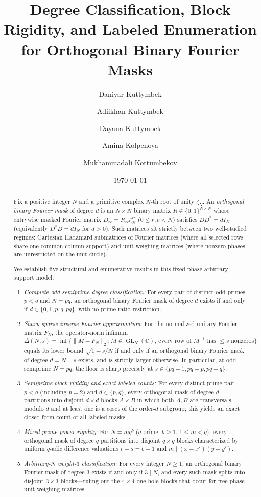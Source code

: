 \documentclass[11pt,reqno]{amsart}
\title[Orthogonal Binary Fourier Masks]{Degree Classification, Block Rigidity, and Labeled Enumeration\\for Orthogonal Binary Fourier Masks}
\author[D. Kuttymbek]{Daniyar Kuttymbek}
\author[A. Kuttymbek]{Adilkhan Kuttymbek}
\author[D. Kuttymbek]{Dayana Kuttymbek}
\author[A. Kolpenova]{Amina Kolpenova}
\author[M. Kottumbekov]{Mukhammadali Kottumbekov}
\date{\today}
\numberwithin{equation}{section}
\theoremstyle{definition}
\theoremstyle{remark}
\newcommand{\C}{\mathbb{C}}
\newcommand{\GL}{\operatorname{GL}}
\begin{document}
\begin{abstract}
Fix a positive integer $N$ and a primitive complex $N$-th root of unity $\zeta_N$. An \emph{orthogonal binary Fourier mask} of degree $d$ is an $N\times N$ binary matrix $R\in\{0,1\}^{N\times N}$ whose entrywise masked Fourier matrix $D_{rc}=R_{rc}\zeta_N^{rc}$ ($0\le r,c<N$) satisfies $DD^*=dI_N$ (equivalently $D^*D=dI_N$ for $d>0$). Such matrices sit strictly between two well-studied regimes: Cartesian Hadamard submatrices of Fourier matrices (where all selected rows share one common column support) and unit weighing matrices (where nonzero phases are unrestricted on the unit circle).

We establish five structural and enumerative results in this fixed-phase arbitrary-support model:
\begin{enumerate}[label=(\arabic*),leftmargin=1.8em]
\item \emph{Complete odd-semiprime degree classification:} For every pair of distinct odd primes $p<q$ and $N=pq$, an orthogonal binary Fourier mask of degree $d$ exists if and only if $d\in\{0,1,p,q,pq\}$, with no prime-ratio restriction.
\item \emph{Sharp sparse-inverse Fourier approximation:} For the normalized unitary Fourier matrix $F_N$, the operator-norm infimum $\Delta(N,s)=\inf\{\|M-F_N\|_2 : M\in\GL_N(\C),\ \text{every row of }M^{-1}\text{ has }\le s\text{ nonzeros}\}$ equals its lower bound $\sqrt{1-s/N}$ if and only if an orthogonal binary Fourier mask of degree $d=N-s$ exists, and is strictly larger otherwise. In particular, at odd semiprime $N=pq$, the floor is sharp precisely at $s\in\{pq-1,pq-p,pq-q\}$.
\item \emph{Semiprime block rigidity and exact labeled counts:} For every distinct prime pair $p<q$ (including $p=2$) and $d\in\{p,q\}$, every orthogonal mask of degree $d$ partitions into disjoint $d\times d$ blocks $A\times B$ in which both $A,B$ are transversals modulo $d$ and at least one is a coset of the order-$d$ subgroup; this yields an exact closed-form count of all labeled masks.
\item \emph{Mixed prime-power rigidity:} For $N=mq^b$ ($q$ prime, $b\ge 1$, $1\le m<q$), every orthogonal mask of degree $q$ partitions into disjoint $q\times q$ blocks characterized by uniform $q$-adic difference valuations $r+s=b-1$ and $m\mid (x-x')(y-y')$.
\item \emph{Arbitrary-$N$ weight-$3$ classification:} For every integer $N\ge 1$, an orthogonal binary Fourier mask of degree $3$ exists if and only if $3\mid N$, and every such mask splits into disjoint $3\times 3$ blocks---ruling out the $4\times 4$ one-hole blocks that occur for free-phase unit weighing matrices.
\end{enumerate}
\end{abstract}
\end{document}
